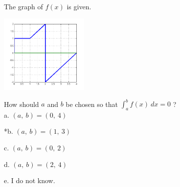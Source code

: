 
The graph of \( f(x) \) is given.

\includegraphics[width=1.71005in,height=1.52489in]{../../Images/IntegralCalculusQ1234.png} 

How should \(a\) and \(b\) be chosen so that \( \int_a^b f ( x )\ dx = 0 \) ?\\


a. \( ( a,\ b ) = ( 0,\ 4 ) \)

*b. \( ( a,\ b ) = ( 1,\ 3 ) \)

c. \( ( a,\ b ) = ( 0,\ 2 ) \)

d. \( ( a,\ b ) = ( 2,\ 4 ) \)

e. I do not know.\\
